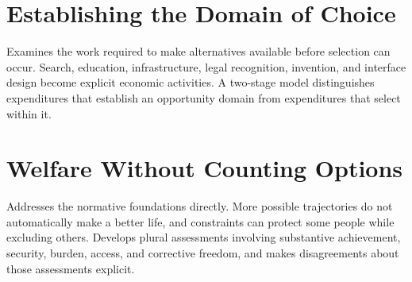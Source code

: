\chapter{Establishing the Domain of Choice}\label{ch:4}
Examines the work required to make alternatives available before selection can occur. Search, education, infrastructure, legal recognition, invention, and interface design become explicit economic activities. A two-stage model distinguishes expenditures that establish an opportunity domain from expenditures that select within it.
\scaffold

\chapter{Welfare Without Counting Options}\label{ch:5}
Addresses the normative foundations directly. More possible trajectories do not automatically make a better life, and constraints can protect some people while excluding others. Develops plural assessments involving substantive achievement, security, burden, access, and corrective freedom, and makes disagreements about those assessments explicit.
\scaffold
